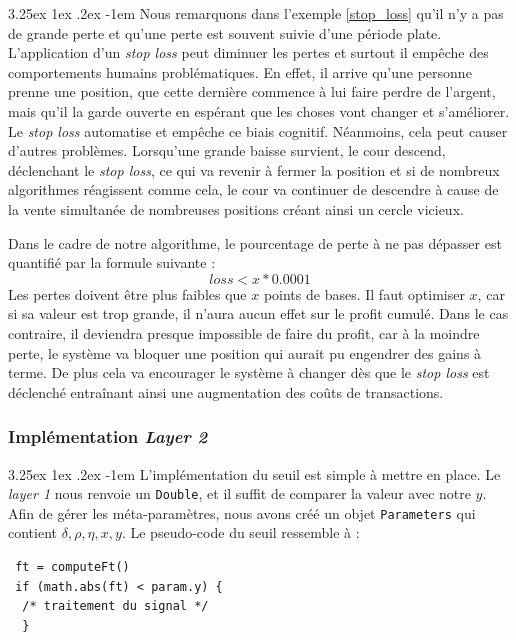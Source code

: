 \documentclass[a4paper, 11pt]{article}
\makeatletter
\renewcommand\paragraph{\@startsection{paragraph}{5}{\z@}%
  {3.25ex \@plus1ex \@minus.2ex}%
  {-1em}%
  {\normalfont\normalsize\bfseries}}
\makeatother
\begin{document}
\paragraph{}
Nous remarquons dans l'exemple \ref{stop_loss} qu'il n'y a pas de grande perte et qu'une perte est souvent suivie d'une période plate. L'application d'un \textit{stop loss}
peut diminuer les pertes et surtout il empêche des comportements humains problématiques. En effet, il arrive qu'une personne prenne une position, que
cette dernière commence à lui faire perdre de l'argent, mais qu'il la garde ouverte en espérant que les choses vont changer et s'améliorer. Le \textit{stop loss}
automatise et empêche ce biais cognitif. Néanmoins, cela peut causer d'autres problèmes. Lorsqu'une grande baisse survient, le cour descend,
déclenchant le \textit{stop loss}, ce qui va revenir à fermer la position et si de nombreux algorithmes réagissent comme cela, le cour va 
continuer de descendre à cause de la vente simultanée de nombreuses positions créant ainsi un cercle vicieux.

Dans le cadre de notre algorithme, le pourcentage de perte à ne pas dépasser est quantifié par la formule suivante :
$$loss < x * 0.0001$$
Les pertes doivent être plus faibles que $x$ points de bases. Il faut optimiser $x$, car si sa valeur est trop grande, il n'aura aucun effet sur le profit
cumulé. Dans le cas contraire, il deviendra presque impossible de faire du profit, car à la moindre perte, le système va bloquer une position qui aurait pu
engendrer des gains à terme. De plus cela va encourager le système à changer dès que le \textit{stop loss} est déclenché entraînant ainsi une augmentation des
coûts de transactions.

\subsubsection{Implémentation \textit{Layer 2}}
\paragraph{}
L'implémentation du seuil est simple à mettre en place. Le \textit{layer 1} nous renvoie un \texttt{Double}, et il suffit de comparer la valeur avec notre
$y$. Afin de gérer les méta-paramètres, nous avons créé un objet \texttt{Parameters} qui contient $\delta,\rho,\eta,x,y$. Le pseudo-code
du seuil ressemble à :

\begin{lstlisting}
 ft = computeFt()
 if (math.abs(ft) < param.y) {
  /* traitement du signal */
  }
\end{lstlisting}
\end{document}
